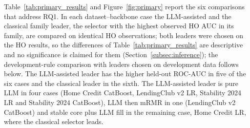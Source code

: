 \documentclass[final,5p,twocolumn]{elsarticle}
\begin{document}
Table~\ref{tab:primary_results} and Figure~\ref{fig:primary} report the six comparisons that address RQ1. In each dataset--backbone case the LLM-assisted and the classical family leader, the selector with the highest observed HO AUC in its family, are compared on identical HO observations; both leaders were chosen on the HO results, so the differences of Table~\ref{tab:primary_results} are descriptive and no significance is claimed for them (Section~\ref{subsec:inference}); the development-rule comparison with leaders chosen on development data follows below. The LLM-assisted leader has the higher held-out ROC-AUC in five of the six cases and the classical leader in the sixth. The LLM-assisted leader is pure LLM in four cases (Home Credit CatBoost, LendingClub v2 LR, Stability 2024 LR and Stability 2024 CatBoost), LLM then mRMR in one (LendingClub v2 CatBoost) and stable core plus LLM fill in the remaining case, Home Credit LR, where the classical selector leads.
\end{document}
